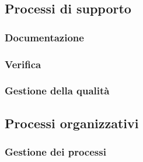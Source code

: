 \documentclass[10pt, letterpaper]{article}
\begin{document}
\begin{table}[H]
    \subsection{Processi di supporto}
    \subsubsection{Documentazione}
    \caption{Tabella dei valori soglia per metriche di documentazione}
\end{table}

\begin{table}[H]
    \subsubsection{Verifica}
    \caption{Tabella dei valori soglia per metriche di verifica}
\end{table}

\begin{table}[H]
    \subsubsection{Gestione della qualità}
    \caption{Tabella dei valori soglia per metriche di gestione della qualità}
\end{table}

\begin{table}[H]
    \subsection{Processi organizzativi}
    \subsubsection{Gestione dei processi}
    \caption{Tabella dei valori soglia per metriche di gestione dei processi}
\end{table}
\end{document}
